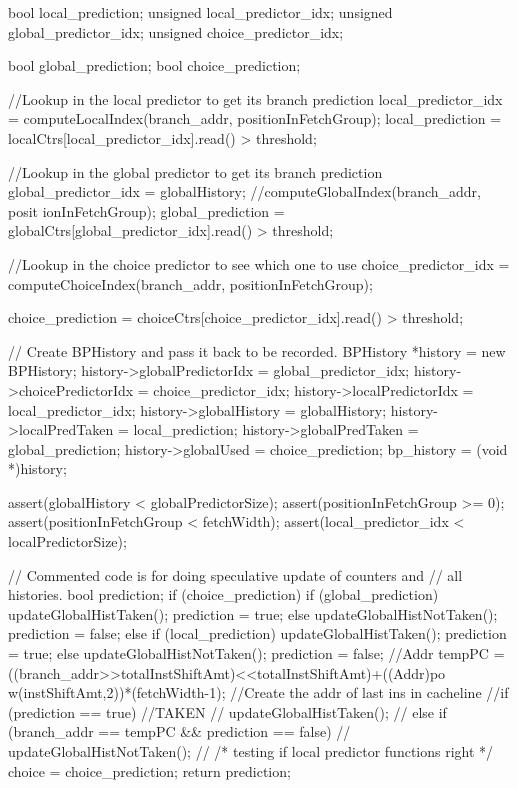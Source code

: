 \begin{DoxyCode}
{
    bool local_prediction;
    unsigned local_predictor_idx;
    unsigned global_predictor_idx;
    unsigned choice_predictor_idx;

    bool global_prediction;
    bool choice_prediction;

    //Lookup in the local predictor to get its branch prediction
    local_predictor_idx = computeLocalIndex(branch_addr, positionInFetchGroup);
    local_prediction = localCtrs[local_predictor_idx].read() > threshold;

    //Lookup in the global predictor to get its branch prediction
    global_predictor_idx = globalHistory; //computeGlobalIndex(branch_addr, posit
      ionInFetchGroup);
    global_prediction = globalCtrs[global_predictor_idx].read() > threshold;

    //Lookup in the choice predictor to see which one to use
    choice_predictor_idx = computeChoiceIndex(branch_addr, positionInFetchGroup);
      
    choice_prediction = choiceCtrs[choice_predictor_idx].read() > threshold;

    // Create BPHistory and pass it back to be recorded.
    BPHistory *history = new BPHistory;
    history->globalPredictorIdx = global_predictor_idx;
    history->choicePredictorIdx = choice_predictor_idx;
    history->localPredictorIdx  = local_predictor_idx;
    history->globalHistory = globalHistory;
    history->localPredTaken = local_prediction;
    history->globalPredTaken = global_prediction;
    history->globalUsed = choice_prediction;
    bp_history = (void *)history;

    assert(globalHistory < globalPredictorSize);
    assert(positionInFetchGroup >= 0);
    assert(positionInFetchGroup < fetchWidth);
    assert(local_predictor_idx < localPredictorSize);

    // Commented code is for doing speculative update of counters and
    // all histories.
        bool prediction;
    if (choice_prediction) {
        if (global_prediction) {
                        updateGlobalHistTaken();
                        prediction = true;
        } else {
                        updateGlobalHistNotTaken();
                        prediction = false;
        }
    } else {
        if (local_prediction) {
                        updateGlobalHistTaken();
                        prediction = true;
        } else {
                        updateGlobalHistNotTaken();
                        prediction = false;
        }
    }
  //Addr tempPC = ((branch_addr>>totalInstShiftAmt)<<totalInstShiftAmt)+((Addr)po
      w(instShiftAmt,2))*(fetchWidth-1); //Create the addr of last ins in cacheline
  //if (prediction == true) { //TAKEN
  //    updateGlobalHistTaken();
  //} else if (branch_addr == tempPC && prediction == false) {
  //    updateGlobalHistNotTaken();
  //}
    /* testing if local predictor functions right */
        choice = choice_prediction;
    return prediction;
}
\end{DoxyCode}


